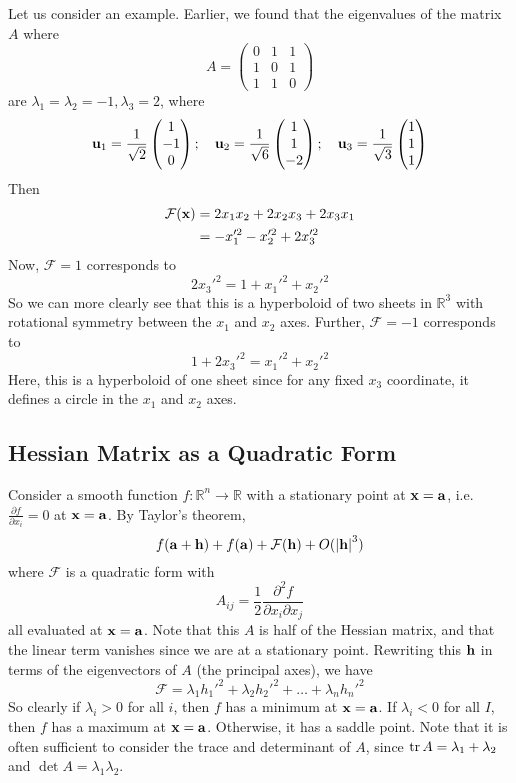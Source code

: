 Let us consider an example. Earlier, we found that the eigenvalues of the matrix \(A\) where
\[ A = \begin{pmatrix}
		0 & 1 & 1 \\ 1 & 0 & 1 \\ 1 & 1 & 0
	\end{pmatrix} \]
are \(\lambda_1 = \lambda_2 = -1, \lambda_3 = 2\), where
\[ \vb u_1 = \frac{1}{\sqrt 2} \begin{pmatrix}
		1 \\ -1 \\ 0
	\end{pmatrix};\quad \vb u_2 = \frac{1}{\sqrt 6}\begin{pmatrix}
		1 \\ 1 \\ -2
	\end{pmatrix};\quad \vb u_3 = \frac{1}{\sqrt 3}\begin{pmatrix}
		1 \\ 1 \\ 1
	\end{pmatrix} \]
Then
\begin{align*}
	\mathcal F(\vb x) & = 2x_1x_2 + 2x_2x_3 + 2x_3x_1 \\
	                  & = -x_1'^2 -x_2'^2 + 2x_3'^2
\end{align*}
Now, \(\mathcal F = 1\) corresponds to
\[ 2x_3'^2 = 1 + x_1'^2 + x_2'^2 \]
So we can more clearly see that this is a hyperboloid of two sheets in \(\mathbb R^3\) with rotational symmetry between the \(x_1\) and \(x_2\) axes. Further, \(\mathcal F = -1\) corresponds to
\[ 1 + 2x_3'^2 = x_1'^2 + x_2'^2 \]
Here, this is a hyperboloid of one sheet since for any fixed \(x_3\) coordinate, it defines a circle in the \(x_1\) and \(x_2\) axes.

\subsection{Hessian Matrix as a Quadratic Form}
Consider a smooth function \(f\colon \mathbb R^n \to \mathbb R\) with a stationary point at \(\vb x = \vb a\), i.e.\ \(\frac{\partial f}{\partial x_i} = 0\) at \(\vb x = \vb a\). By Taylor's theorem,
\[ f(\vb a + \vb h) + f(\vb a) + \mathcal F(\vb h) + O(\abs{\vb h}^3) \]
where \(\mathcal F\) is a quadratic form with
\[ A_{ij} = \frac{1}{2}\frac{\partial^2 f}{\partial x_i\partial x_j} \]
all evaluated at \(\vb x = \vb a\). Note that this \(A\) is half of the Hessian matrix, and that the linear term vanishes since we are at a stationary point. Rewriting this \(\vb h\) in terms of the eigenvectors of \(A\) (the principal axes), we have
\[ \mathcal F = \lambda_1 h_1'^2 + \lambda_2 h_2'^2 + \dots + \lambda_n h_n'^2 \]
So clearly if \(\lambda_i > 0\) for all \(i\), then \(f\) has a minimum at \(\vb x = \vb a\). If \(\lambda_i < 0\) for all \(I\), then \(f\) has a maximum at \(\vb x = \vb a\). Otherwise, it has a saddle point. Note that it is often sufficient to consider the trace and determinant of \(A\), since \(\trace A = \lambda_1 + \lambda_2\) and \(\det A = \lambda_1\lambda_2\).
